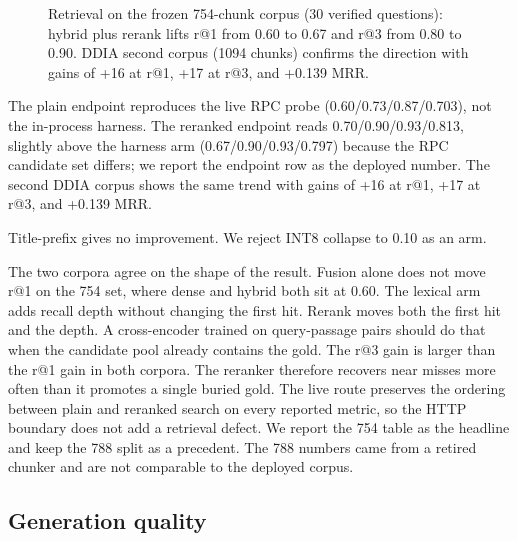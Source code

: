 \documentclass[sn-mathphys,Numbered]{sn-jnl}%
\theoremstyle{thmstyleone}%
\theoremstyle{thmstyletwo}%
\theoremstyle{thmstylethree}%
\begin{document}
\begin{figure}[htbp]%
\centering
{}
\caption{Retrieval on the frozen 754-chunk corpus (30 verified questions): hybrid plus rerank lifts r@1 from 0.60 to 0.67 and r@3 from 0.80 to 0.90. DDIA second corpus (1094 chunks) confirms the direction with gains of +16 at r@1, +17 at r@3, and +0.139 MRR.}\label{fig:retacc}
\end{figure}

The plain endpoint reproduces the live RPC probe (0.60\slash 0.73\slash 0.87\slash 0.703), not the in-process harness. The reranked endpoint reads 0.70\slash 0.90\slash 0.93\slash 0.813, slightly above the harness arm (0.67\slash 0.90\slash 0.93\slash 0.797) because the RPC candidate set differs; we report the endpoint row as the deployed number. The second DDIA corpus shows the same trend with gains of +16 at r@1, +17 at r@3, and +0.139 MRR.

Title-prefix gives no improvement. We reject INT8 collapse to 0.10 as an arm.

The two corpora agree on the shape of the result. Fusion alone does not move r@1 on the 754 set, where dense and hybrid both sit at 0.60. The lexical arm adds recall depth without changing the first hit. Rerank moves both the first hit and the depth. A cross-encoder trained on query-passage pairs should do that when the candidate pool already contains the gold. The r@3 gain is larger than the r@1 gain in both corpora. The reranker therefore recovers near misses more often than it promotes a single buried gold. The live route preserves the ordering between plain and reranked search on every reported metric, so the HTTP boundary does not add a retrieval defect. We report the 754 table as the headline and keep the 788 split as a precedent. The 788 numbers came from a retired chunker and are not comparable to the deployed corpus.

\subsection{Generation quality}\label{subsec42}
\end{document}
